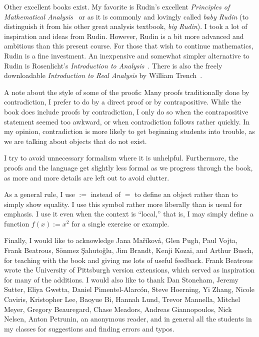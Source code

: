 \documentclass[12pt]{book}
\theoremstyle{plain}
\theoremstyle{remark}
\theoremstyle{definition}
\theoremstyle{exercise}
\theoremstyle{example}
\begin{document}
Other excellent books exist.  My favorite is 
Rudin's excellent
\emph{Principles of Mathematical Analysis}~\cite{Rudin:baby}
or as it is commonly and lovingly called \emph{baby Rudin}
(to distinguish it from his other great analysis textbook,
\emph{big Rudin}).  I took a
lot of inspiration and ideas from Rudin.  However, Rudin is a bit more
advanced and ambitious than this present course.
For those that wish to continue
mathematics, Rudin is a fine investment.
An inexpensive and somewhat simpler alternative to Rudin is
Rosenlicht's \emph{Introduction to Analysis}~\cite{Rosenlicht}.
There is also the freely downloadable \emph{Introduction to Real
Analysis} by William Trench~\cite{Trench}.

\medskip

A note about the style of some of the proofs:  Many proofs
traditionally done by contradiction, I prefer to do by
a direct proof or by contrapositive.  While the book does include
proofs by contradiction, I only
do so when the contrapositive statement seemed too awkward, or when 
contradiction follows rather quickly.  In my opinion,
contradiction is more likely to get beginning students into trouble,
as we are talking about objects that do not exist.

I try to avoid unnecessary formalism where it is unhelpful.
Furthermore, the proofs and the language get slightly less formal as we
progress through the book, as more and more details are left out to avoid
clutter.

As a general rule, I use $:=$ instead of $=$ to define an
object rather than to simply show equality.  I use this symbol rather more
liberally than is usual for emphasis.
I use it even when the context is ``local,''
that is, I may simply define a function $f(x) := x^2$
for a single exercise or example.

\medskip

Finally, I would like to acknowledge Jana Ma\v{r}\'ikov\'a,
Glen Pugh, Paul Vojta, Frank Beatrous, S\"{o}nmez \c{S}ahuto\u{g}lu,
Jim Brandt, Kenji Kozai, and Arthur Busch,
for teaching with the book and giving me lots of useful feedback.
Frank Beatrous wrote the University of Pittsburgh version extensions, which
served as inspiration for many of the additions.
I would also like to thank
Dan Stoneham, Jeremy Sutter, Eliya Gwetta, Daniel Pimentel-Alarc\'on,
Steve Hoerning, Yi Zhang, Nicole Caviris,
Kristopher Lee, Baoyue Bi, Hannah Lund,
Trevor Mannella, Mitchel Meyer, Gregory Beauregard,
Chase Meadors, Andreas Giannopoulos, Nick Nelsen, Anton Petrunin,
an anonymous reader, and in general all the students in my classes for suggestions and
finding errors and typos.
\end{document}
